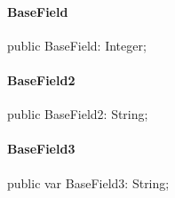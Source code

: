 \documentclass{report}
\begin{document}
\paragraph*{BaseField}\hspace*{\fill}

\begin{list}{}{
\setlength{\itemindent}{0cm}
\setlength{\listparindent}{0cm}
\setlength{\leftmargin}{\evensidemargin}
\addtolength{\leftmargin}{\tmplength}
\settowidth{\labelsep}{X}
\addtolength{\leftmargin}{\labelsep}
\setlength{\labelwidth}{\tmplength}
}
\begin{flushleft}
\item[\textbf{Declaration}\hfill]
\begin{ttfamily}
public BaseField: Integer;\end{ttfamily}


\end{flushleft}
\end{list}
\paragraph*{BaseField2}\hspace*{\fill}

\begin{list}{}{
\setlength{\itemindent}{0cm}
\setlength{\listparindent}{0cm}
\setlength{\leftmargin}{\evensidemargin}
\addtolength{\leftmargin}{\tmplength}
\settowidth{\labelsep}{X}
\addtolength{\leftmargin}{\labelsep}
\setlength{\labelwidth}{\tmplength}
}
\begin{flushleft}
\item[\textbf{Declaration}\hfill]
\begin{ttfamily}
public BaseField2: String;\end{ttfamily}


\end{flushleft}
\end{list}
\paragraph*{BaseField3}\hspace*{\fill}

\begin{list}{}{
\setlength{\itemindent}{0cm}
\setlength{\listparindent}{0cm}
\setlength{\leftmargin}{\evensidemargin}
\addtolength{\leftmargin}{\tmplength}
\settowidth{\labelsep}{X}
\addtolength{\leftmargin}{\labelsep}
\setlength{\labelwidth}{\tmplength}
}
\begin{flushleft}
\item[\textbf{Declaration}\hfill]
\begin{ttfamily}
public var BaseField3: String;\end{ttfamily}


\end{flushleft}
\end{list}
\end{document}
